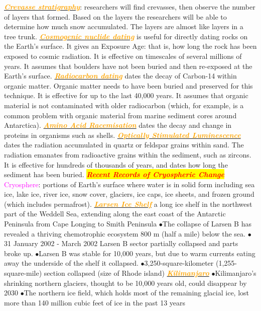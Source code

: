 \documentclass{article}
\newcommand{\ddd}{$\bullet$}
\newcommand{\red}[1]{\textcolor{red}{#1}}
\newcommand{\pink}[1]{\textcolor{magenta}{#1}}
\newcommand{\orange}[1]{\textcolor{orange}{#1}}
\newcommand{\mysection}[1]{\colorbox{yellow}{\textbf{\textit{\red{#1}}}}}
\newcommand{\mysub}[1]{\underline{\textbf{{\textit{\orange{#1}}}}}}
\newcommand{\vocab}[1]{{\pink{#1}}}
\begin{document}
\begin{multicols*}{4}
            \mysub{Crevasse stratigraphy}: researchers will find crevasses, then observe the number of layers that formed. Based on the layers the researchers will be able to determine how much snow accumulated. The layers are almost like layers in a tree trunk.
            \mysub{Cosmogenic nuclide dating} is useful for directly dating rocks on the Earth’s surface. It gives an Exposure Age: that is, how long the rock has been exposed to cosmic radiation. It is effective on timescales of several millions of years. It assumes that boulders have not been buried and then re-exposed at the Earth’s surface.
            \mysub{Radiocarbon dating} dates the decay of Carbon-14 within organic matter. Organic matter needs to have been buried and preserved for this technique. It is effective for up to the last 40,000 years. It assumes that organic material is not contaminated with older radiocarbon (which, for example, is a common problem with organic material from marine sediment cores around Antarctica).
            \mysub{Amino Acid Racemisation} dates the decay and change in proteins in organisms such as shells.
            \mysub{Optically Stimulated Luminescence} dates the radiation accumulated in quartz or feldspar grains within sand. The radiation emanates from radioactive grains within the sediment, such as zircons. It is effective for hundreds of thousands of years, and dates how long the sediment has been buried.
        \mysection{Recent Records of Cryospheric Change}
            \vocab{Cryosphere}: portions of Earth’s surface where water is in solid form including sea ice, lake ice, river ice, snow cover, glaciers, ice caps, ice sheets, and frozen ground (which includes permafrost).
            \mysub{Larsen Ice Shelf}
                a long ice shelf in the northwest part of the Weddell Sea, extending along the east coast of the Antarctic Peninsula from Cape Longing to Smith Peninsula
                \ddd The collapse of Larsen B has revealed a thriving chemotrophic ecosystem 800 m (half a mile) below the sea.
                \ddd 31 January 2002 - March 2002 Larsen B sector partially collapsed and parts broke up. 
                \ddd Larsen B was stable for 10,000 years, but due to warm currents eating away the underside of the shelf it collapsed. 
                \ddd 3,250-square-kilometer (1,255-square-mile) section collapsed (size of Rhode island)
            \mysub{Kilimanjaro}
                \ddd Kilimanjaro's shrinking northern glaciers, thought to be 10,000 years old, could disappear by 2030
                \ddd The northern ice field, which holds most of the remaining glacial ice, lost more than 140 million cubic feet of ice in the past 13 years

\end{multicols*}
\end{document}
